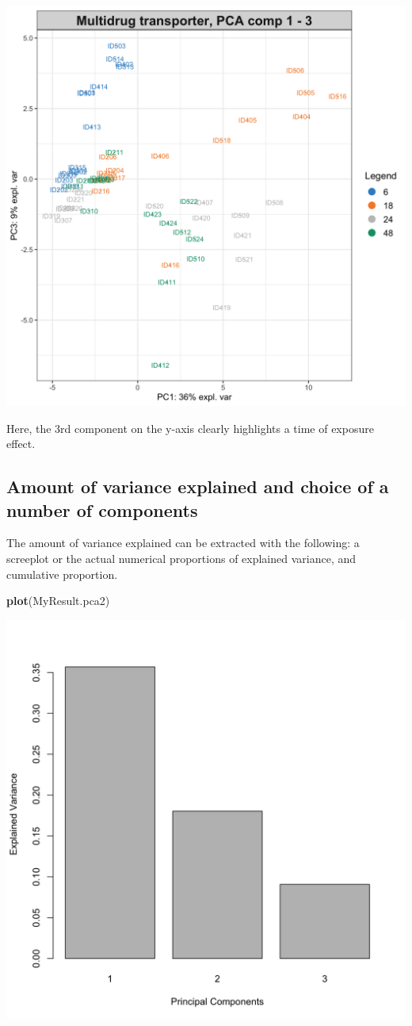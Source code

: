 \documentclass[]{book}
\newenvironment{Shaded}{\begin{snugshade}}{\end{snugshade}}
\newcommand{\KeywordTok}[1]{\textcolor[rgb]{0.13,0.29,0.53}{\textbf{#1}}}
\newcommand{\NormalTok}[1]{#1}
\begin{document}
\begin{center}\includegraphics[width=0.75\linewidth,]{Figures/03-pca-liver-2-1} \end{center}

Here, the 3rd component on the y-axis clearly highlights a time of exposure effect.

\hypertarget{amount-of-variance-explained-and-choice-of-a-number-of-components}{%
\subsection{Amount of variance explained and choice of a number of components}\label{amount-of-variance-explained-and-choice-of-a-number-of-components}}

The amount of variance explained can be extracted with the following: a screeplot or the actual numerical proportions of explained variance, and cumulative proportion.

\begin{Shaded}
\begin{Highlighting}[]
\KeywordTok{plot}\NormalTok{(MyResult.pca2)}
\end{Highlighting}
\end{Shaded}

\begin{center}\includegraphics[width=0.75\linewidth,]{Figures/03-pca-liver-2-plot-1} \end{center}
\end{document}

